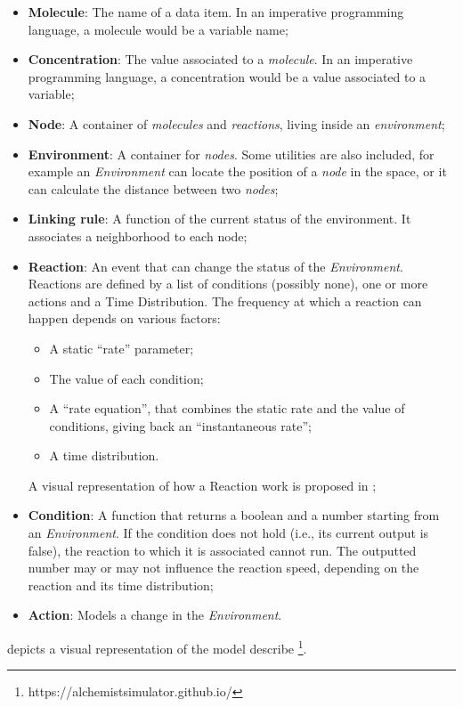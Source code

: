 \begin{itemize}
	\item \textbf{Molecule}: The name of a data item. In an imperative programming language, a molecule would be a variable name;
	\item \textbf{Concentration}: The value associated to a \textit{molecule}. In an imperative programming language, a concentration would be a value associated to a variable;
	\item \textbf{Node}: A container of \textit{molecules} and \textit{reactions}, living inside an \textit{environment};
	\item \textbf{Environment}: A container for \textit{nodes}. Some utilities are also included, for example an \textit{Environment} can locate the position of a \textit{node} in the space, or it can calculate the distance between two \textit{nodes};
	\item \textbf{Linking rule}: A function of the current status of the environment. It associates a neighborhood to each node;
	\item \textbf{Reaction}: An event that can change the status of the \textit{Environment}. Reactions are defined by a list of conditions (possibly none), one or more actions and  a Time Distribution. The frequency at which a reaction can happen depends on various factors:
	\begin{itemize}
		\item A static “rate” parameter;
		\item The value of each condition;
		\item A “rate equation”, that combines the static rate and the value of conditions, giving back an “instantaneous rate”;
		\item A time distribution.
	\end{itemize}
	A visual representation of how a Reaction work is proposed in ;
	\item \textbf{Condition}: A function that returns a boolean and a number starting from an \textit{Environment}. If the condition does not hold (i.e., its current output is false), the reaction to which it is associated cannot run.
	The outputted number may or may not influence the reaction speed, depending on the reaction and its time distribution;
	\item \textbf{Action}: Models a change in the \textit{Environment}.
\end{itemize}
 depicts a visual representation of the model describe  \footnote{https://alchemistsimulator.github.io/}.

